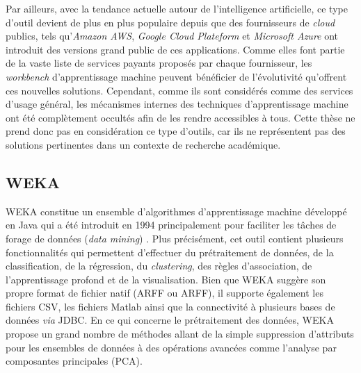 Par ailleurs, avec la tendance actuelle autour de l'intelligence artificielle, ce type d'outil devient de plus en plus populaire depuis que des fournisseurs de \textit{cloud} publics, tels qu'\textit{Amazon AWS}, \textit{Google Cloud Plateform} et \textit{Microsoft Azure} ont introduit des versions grand public de ces applications. Comme elles font partie de la vaste liste de services payants proposés par chaque fournisseur, les \textit{workbench} d'apprentissage machine peuvent bénéficier de l'évolutivité qu'offrent ces nouvelles solutions. Cependant, comme ils sont considérés comme des services d'usage général, les mécanismes internes des techniques d'apprentissage machine ont été complètement occultés afin de les rendre accessibles à tous. Cette thèse ne prend donc pas en considération ce type d'outils, car ils ne représentent pas des solutions pertinentes dans un contexte de recherche académique.

\subsection{WEKA}

\acs{WEKA} constitue un ensemble d'algorithmes d'apprentissage machine développé en Java qui a été introduit en 1994 principalement pour faciliter les tâches de forage de données (\textit{data mining}) \citep{Holmes1994}. Plus précisément, cet outil contient plusieurs fonctionnalités qui permettent d'effectuer du prétraitement de données, de la classification, de la régression, du \textit{clustering}, des règles d'association, de l'apprentissage profond et de la visualisation. Bien que \acs{WEKA} suggère son propre format de fichier natif (\acl{ARFF} ou \acs{ARFF}), il supporte également les fichiers \acs{CSV}, les fichiers Matlab ainsi que la connectivité à plusieurs bases de données \textit{via} \ac{JDBC}. En ce qui concerne le prétraitement des données, \acs{WEKA} propose un grand nombre de méthodes allant de la simple suppression d'attributs pour les ensembles de données à des opérations avancées comme l'analyse par composantes principales (\acs{PCA}).

